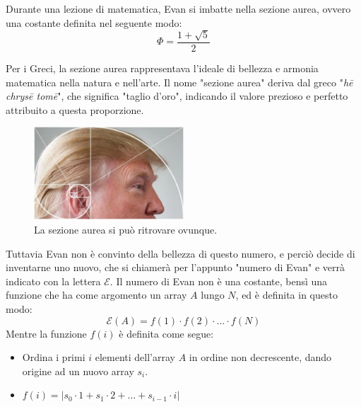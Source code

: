 \usepackage{xcolor}
\usepackage{afterpage}
\usepackage{pifont,mdframed}
\usepackage[bottom]{footmisc}
\usepackage{minted}

\newcommand{\inputfile}{\texttt{stdin}}
\newcommand{\outputfile}{\texttt{stdout}}
\makeatletter
\renewcommand{\this@inputfilename}{\texttt{stdin}}
\renewcommand{\this@outputfilename}{\texttt{stdout}}
\renewcommand{\this@syllabuslevel}{5}
\renewcommand{\this@custdifficulty}{3}
\makeatother
{}

Durante una lezione di matematica, Evan si imbatte nella sezione aurea, ovvero una costante definita nel seguente modo:
$$\Phi = \frac{1 + \sqrt{5}}{2}$$

Per i Greci, la sezione aurea rappresentava l'ideale di bellezza e armonia matematica nella natura e nell'arte. Il nome
"sezione aurea" deriva dal greco "\textit{hē chrysē tomē}", che significa "taglio d'oro", indicando il valore prezioso e perfetto
attribuito a questa proporzione.

\begin{figure}[h]
    \centering
    \includegraphics[width=0.5\textwidth]{aureo.png}
    \caption{La sezione aurea si può ritrovare ovunque.}
\end{figure}

Tuttavia Evan non è convinto della bellezza di questo numero, e perciò decide di inventarne uno nuovo, che si chiamerà per l'appunto
"numero di Evan" e verrà indicato con la lettera $\mathcal{E}$. Il numero di Evan non è una costante, bensì una funzione che ha come
argomento un array $A$ lungo $N$, ed è definita in questo modo:
$$\mathcal{E}(A) = f(1) \cdot f(2) \cdot … \cdot  f(N)$$
Mentre la funzione $f(i)$ è definita come segue:
\begin{itemize}
    \item Ordina i primi $i$ elementi dell'array $A$ in ordine non decrescente, dando origine ad un nuovo array $s_i$.
    \item $f(i) = |s_0\cdot 1 + s_1 \cdot 2+ … + s_{i-1} \cdot i|$
\end{itemize}

